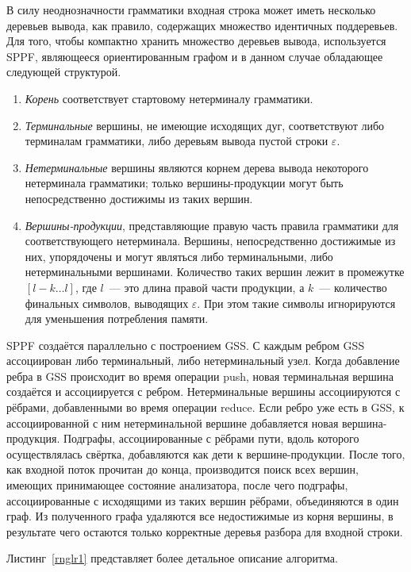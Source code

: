 В силу неоднозначности грамматики входная строка может иметь несколько деревьев вывода, как правило, содержащих множество идентичных поддеревьев. Для того, чтобы компактно хранить множество деревьев вывода, используется SPPF, являющееся ориентированным графом и в данном случае обладающее следующей структурой.
\begin{enumerate}
  \item \emph{Корень} соответствует стартовому нетерминалу грамматики.
  \item \emph{Терминальные} вершины, не имеющие исходящих дуг, соответствуют либо терминалам грамматики, либо деревьям вывода пустой строки $\varepsilon$.
  \item \emph{Нетерминальные} вершины являются корнем дерева вывода некоторого нетерминала грамматики; только вершины-продукции могут быть непосредственно достижимы из таких вершин.
  \item \emph{Вершины-продукции}, представляющие правую часть правила грамматики для соответствующего нетерминала. Вершины, непосредственно достижимые из них, упорядочены и могут являться либо терминальными, либо нетерминальными вершинами. Количество таких вершин лежит в промежутке $[l-k \dots l]$, где $l$~--- это длина правой части продукции, а $k$~--- количество финальных символов, выводящих $\varepsilon$. При этом такие символы игнорируются для уменьшения потребления памяти.
\end{enumerate}

SPPF создаётся параллельно с построением GSS. С каждым ребром GSS ассоциирован либо терминальный, либо нетерминальный узел. Когда добавление ребра в GSS происходит во время операции push, новая терминальная вершина создаётся и ассоциируется с ребром. Нетерминальные вершины ассоциируются с рёбрами, добавленными во время операции reduce. Если ребро уже есть в GSS, к ассоциированной с ним нетерминальной вершине добавляется новая вершина-продукция. Подграфы, ассоциированные с рёбрами пути, вдоль которого осуществлялась свёртка, добавляются как дети к вершине-продукции. После того, как входной поток прочитан до конца, производится поиск всех вершин, имеющих принимающее состояние анализатора, после чего подграфы, ассоциированные с исходящими из таких вершин рёбрами, объединяются в один граф. Из полученного графа удаляются все недостижимые из корня вершины, в результате чего остаются только корректные деревья разбора для входной строки. 

Листинг~\ref{rnglr1} представляет более детальное описание алгоритма.

